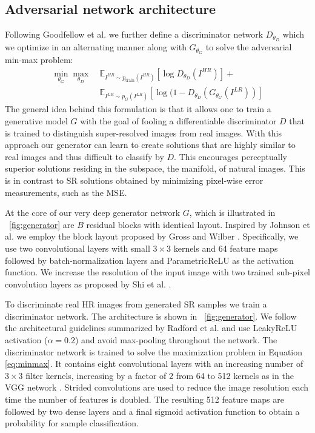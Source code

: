 \documentclass[10pt,twocolumn,letterpaper]{article}
\begin{document}
\subsection{Adversarial network architecture}
Following Goodfellow et al. \cite{Goodfellow14GAN} we further define a discriminator network $D_{\theta_D}$ which we optimize in an alternating manner along with $G_{\theta_G}$ to solve the adversarial min-max problem:
\begin{equation}
\label{eq:minmax}
\begin{split}
\min_{\theta_G} \max_{\theta_D} ~& \mathbb{E}_{I^{HR}\sim p_\textrm{train}(I^{HR})} [ \log D_{\theta_D}(I^{HR}) ] + \\
& \mathbb{E}_{I^{LR}\sim p_G(I^{LR})} [ \log (1-D_{\theta_D}(G_{\theta_G}(I^{LR})) ]
\end{split}
\end{equation}
The general idea behind this formulation is that it allows one to train a generative model $G$ with the goal of fooling a differentiable discriminator $D$ that is trained to distinguish super-resolved images from real images.
With this approach our generator can learn to create solutions that are highly similar to real images and thus difficult to classify by $D$. This encourages perceptually superior solutions residing in the subspace, the manifold, of natural images. This is in contrast to \ac{SR} solutions obtained by minimizing pixel-wise error measurements, such as the \ac{MSE}.

At the core of our very deep generator network $G$, which is illustrated in \figurename~\ref{fig:generator} are $B$ residual blocks with identical layout. Inspired by Johnson et al. \cite{Johnson16PercepLoss} we employ the block layout proposed by Gross and Wilber \cite{gross2016}. Specifically, we use two convolutional layers with small $3\times3$ kernels and 64 feature maps followed by batch-normalization layers \cite{Ioffe2015} and ParametricReLU \cite{He2015relu} as the activation function.
We increase the resolution of the input image with two trained sub-pixel convolution layers as proposed by Shi et al. \cite{Shi2016ESPCN}.

To discriminate real \ac{HR} images from generated \ac{SR} samples we train a discriminator network. The architecture is shown in \figurename~\ref{fig:generator}.
We follow the architectural guidelines summarized by Radford et al. \cite{Radford2015} and use LeakyReLU activation ($\alpha=0.2$) and avoid max-pooling throughout the network. The discriminator network is trained to solve the maximization problem in Equation \ref{eq:minmax}. It contains eight convolutional layers with an increasing number of $3\times3$ filter kernels, increasing by a factor of 2 from 64 to 512 kernels as in the VGG network \cite{simonyan2014very}. Strided convolutions are used to reduce the image resolution each time the number of features is doubled. The resulting 512 feature maps are followed by two dense layers and a final sigmoid activation function to obtain a probability for sample classification.
\end{document}
